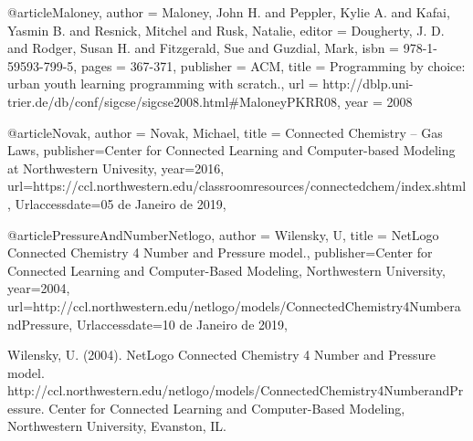 

@article{Maloney,
  author = {Maloney, John H. and Peppler, Kylie A. and Kafai, Yasmin B. and Resnick, Mitchel and Rusk, Natalie},
  editor = {Dougherty, J. D. and Rodger, Susan H. and Fitzgerald, Sue and Guzdial, Mark},
  isbn = {978-1-59593-799-5},
  pages = {367-371},
  publisher = {ACM},
  title = {Programming by choice: urban youth learning programming with scratch.},
  url = {http://dblp.uni-trier.de/db/conf/sigcse/sigcse2008.html#MaloneyPKRR08},
  year = 2008
}

@article{Novak,
	author = {Novak, Michael}, 
	title = {{Connected Chemistry – Gas Laws}},
	publisher={Center for Connected Learning and Computer-based Modeling at Northwestern Univesity},
	year={2016},
	url={https://ccl.northwestern.edu/classroomresources/connectedchem/index.shtml},
	Urlaccessdate={05 de Janeiro de 2019},
}

@article{PressureAndNumberNetlogo,
	author = {Wilensky, U}, 
	title = {{NetLogo Connected Chemistry 4 Number and Pressure model.}},
	publisher={Center for Connected Learning and Computer-Based Modeling, Northwestern University},
	year={2004},
	url={http://ccl.northwestern.edu/netlogo/models/ConnectedChemistry4NumberandPressure},
	Urlaccessdate={10 de Janeiro de 2019},
}

Wilensky, U. (2004). NetLogo Connected Chemistry 4 Number and Pressure model. http://ccl.northwestern.edu/netlogo/models/ConnectedChemistry4NumberandPressure. Center for Connected Learning and Computer-Based Modeling, Northwestern University, Evanston, IL.



